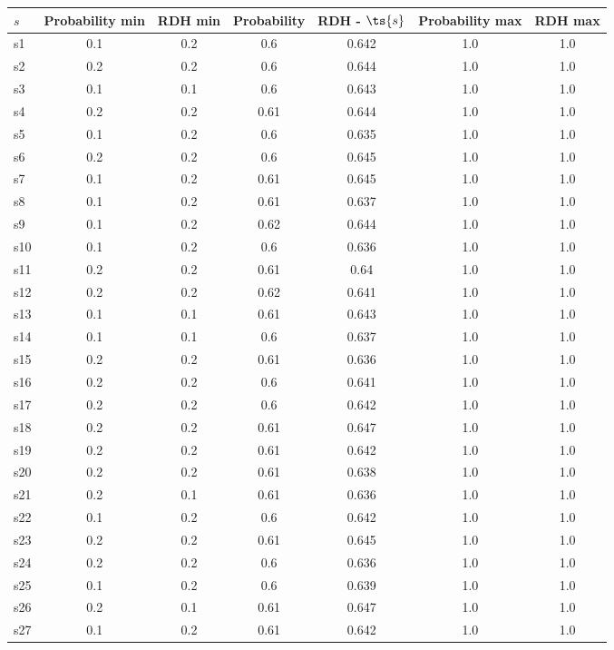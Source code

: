 \documentclass{article}
\begin{document}
\noindent\begin{tabular}{|l|c|c|c|c|c|c|}
\hline
$s$& Probability min & RDH min & Probability & RDH - $\ts{s}$ & Probability max & RDH max\\
\hline
s1 &0.1 & 0.2 & 0.6 & 0.642 & 1.0 & 1.0\\
\hline
s2 &0.2 & 0.2 & 0.6 & 0.644 & 1.0 & 1.0\\
\hline
s3 &0.1 & 0.1 & 0.6 & 0.643 & 1.0 & 1.0\\
\hline
s4 &0.2 & 0.2 & 0.61 & 0.644 & 1.0 & 1.0\\
\hline
s5 &0.1 & 0.2 & 0.6 & 0.635 & 1.0 & 1.0\\
\hline
s6 &0.2 & 0.2 & 0.6 & 0.645 & 1.0 & 1.0\\
\hline
s7 &0.1 & 0.2 & 0.61 & 0.645 & 1.0 & 1.0\\
\hline
s8 &0.1 & 0.2 & 0.61 & 0.637 & 1.0 & 1.0\\
\hline
s9 &0.1 & 0.2 & 0.62 & 0.644 & 1.0 & 1.0\\
\hline
s10 &0.1 & 0.2 & 0.6 & 0.636 & 1.0 & 1.0\\
\hline
s11 &0.2 & 0.2 & 0.61 & 0.64 & 1.0 & 1.0\\
\hline
s12 &0.2 & 0.2 & 0.62 & 0.641 & 1.0 & 1.0\\
\hline
s13 &0.1 & 0.1 & 0.61 & 0.643 & 1.0 & 1.0\\
\hline
s14 &0.1 & 0.1 & 0.6 & 0.637 & 1.0 & 1.0\\
\hline
s15 &0.2 & 0.2 & 0.61 & 0.636 & 1.0 & 1.0\\
\hline
s16 &0.2 & 0.2 & 0.6 & 0.641 & 1.0 & 1.0\\
\hline
s17 &0.2 & 0.2 & 0.6 & 0.642 & 1.0 & 1.0\\
\hline
s18 &0.2 & 0.2 & 0.61 & 0.647 & 1.0 & 1.0\\
\hline
s19 &0.2 & 0.2 & 0.61 & 0.642 & 1.0 & 1.0\\
\hline
s20 &0.2 & 0.2 & 0.61 & 0.638 & 1.0 & 1.0\\
\hline
s21 &0.2 & 0.1 & 0.61 & 0.636 & 1.0 & 1.0\\
\hline
s22 &0.1 & 0.2 & 0.6 & 0.642 & 1.0 & 1.0\\
\hline
s23 &0.2 & 0.2 & 0.61 & 0.645 & 1.0 & 1.0\\
\hline
s24 &0.2 & 0.2 & 0.6 & 0.636 & 1.0 & 1.0\\
\hline
s25 &0.1 & 0.2 & 0.6 & 0.639 & 1.0 & 1.0\\
\hline
s26 &0.2 & 0.1 & 0.61 & 0.647 & 1.0 & 1.0\\
\hline
s27 &0.1 & 0.2 & 0.61 & 0.642 & 1.0 & 1.0\\

\end{tabular}
\end{document}
